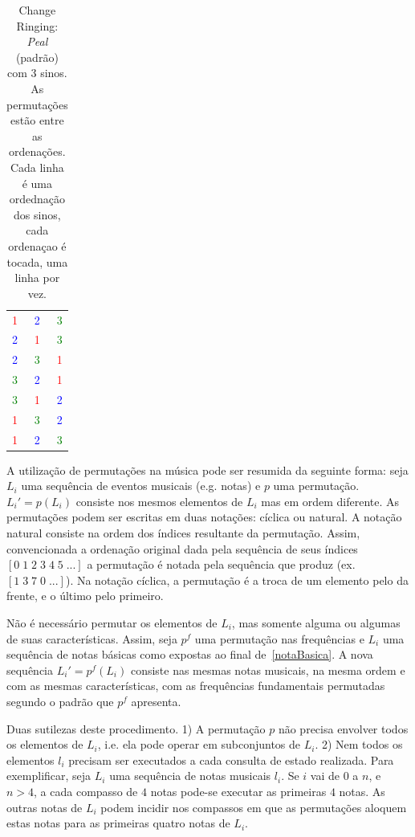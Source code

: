 \begin{table}[htpq!]
\centering
\caption{Change Ringing: \emph{Peal} (padrão) com 3 sinos. As permutações estão entre as ordenações. Cada linha é uma ordednação dos sinos, cada ordenaçao é tocada, uma linha por vez.}
\begin{tabular}{l c r}
\textcolor{red}{1} & \textcolor{blue}{2} & \textcolor{green}{3} \\
\textcolor{blue}{2} & \textcolor{red}{1} & \textcolor{green}{3} \\
\textcolor{blue}{2} & \textcolor{green}{3} & \textcolor{red}{1} \\
\textcolor{green}{3} & \textcolor{blue}{2} & \textcolor{red}{1} \\
\textcolor{green}{3} & \textcolor{red}{1} & \textcolor{blue}{2} \\
\textcolor{red}{1} & \textcolor{green}{3} & \textcolor{blue}{2} \\
\textcolor{red}{1} & \textcolor{blue}{2} & \textcolor{green}{3}
\end{tabular}
\label{tab:change}
\end{table}


A utilização de permutações na música pode ser resumida da seguinte forma:
seja $L_i$ uma sequência de eventos musicais (e.g. notas) e $p$ uma permutação.
$L_i'=p(L_i)$ consiste nos mesmos elementos de $L_i$ mas em ordem diferente.
As permutações podem ser escritas em duas notações: cíclica ou natural. 
A notação natural consiste na ordem dos índices 
resultante da permutação. Assim,
convencionada a ordenação original dada pela sequência de seus índices $[0\;1\;2\;3\;4\;5\;...]$ a permutação é notada pela sequência que produz (ex. $[1\;3\;7\;0\;...]$). Na notação cíclica, a permutação é a troca de um elemento pelo
da frente, e o último pelo primeiro.

Não é necessário permutar os elementos de $L_i$, mas somente
alguma ou algumas de suas características. Assim, seja $p^f$ uma permutação 
nas frequências e $L_i$ uma sequência de notas básicas como expostas
ao final de~\ref{notaBasica}. A nova sequência $L_i'=p^f(L_i)$ consiste nas mesmas
notas musicais, na mesma ordem e com as mesmas características, com as frequências fundamentais permutadas segundo o padrão que $p^f$ apresenta.

Duas sutilezas deste procedimento.
1) A permutação $p$ não precisa envolver todos os elementos de $L_i$, i.e. ela
pode operar em subconjuntos de $L_i$. 2) Nem todos os elementos $l_i$ precisam ser executados a cada consulta de estado realizada.
Para exemplificar, seja $L_i$ 
uma sequência de notas musicais $l_i$. 
Se $i$ vai de $0$ a $n$, e $n>4$, a cada compasso
de $4$ notas pode-se executar as primeiras $4$ notas. As outras notas de
$L_i$ podem incidir nos compassos em que as permutações aloquem
estas notas para as primeiras quatro notas de $L_i$.

